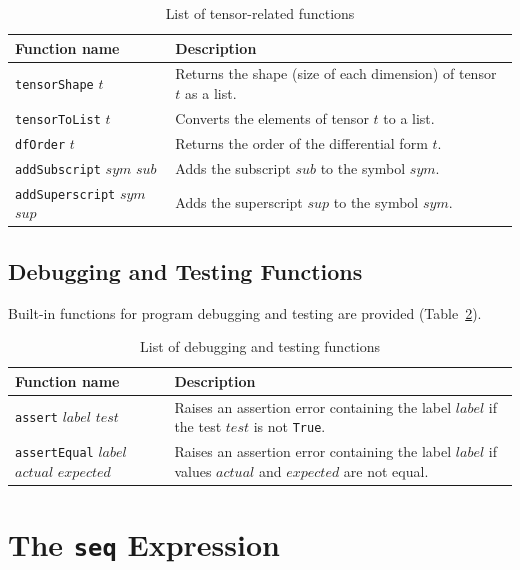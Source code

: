 \begin{table}[h]
  \begin{center}
    \begin{tabular}{ | l | p{9cm} |}
    \hline
    Function name & Description \\ \hline
    \texttt{tensorShape} $t$ & Returns the shape (size of each dimension) of tensor $t$ as a list. \\ \hline
    \texttt{tensorToList} $t$ & Converts the elements of tensor $t$ to a list. \\ \hline
    \texttt{dfOrder} $t$ & Returns the order of the differential form $t$. \\ \hline
    \texttt{addSubscript} $sym$ $sub$ & Adds the subscript $sub$ to the symbol $sym$. \\ \hline
    \texttt{addSuperscript} $sym$ $sup$ & Adds the superscript $sup$ to the symbol $sym$. \\ \hline
    \end{tabular}
\end{center}
    \caption{List of tensor-related functions}
    \label{tab:tensorFunctions}
\end{table}

\subsection{Debugging and Testing Functions}

Built-in functions for program debugging and testing are provided (Table~\ref{tab:debugFunctions}).

\begin{table}[h]
  \begin{center}
    \begin{tabular}{ | l | p{9cm} |}
    \hline
    Function name & Description \\ \hline
    \texttt{assert} $label$ $test$ & Raises an assertion error containing the label $label$ if the test $test$ is not \texttt{True}. \\ \hline
    \texttt{assertEqual} $label$ $actual$ $expected$ & Raises an assertion error containing the label $label$ if values $actual$ and $expected$ are not equal. \\ \hline
    \end{tabular}
\end{center}
    \caption{List of debugging and testing functions}
    \label{tab:debugFunctions}
\end{table}

\section{The \texttt{seq} Expression}

